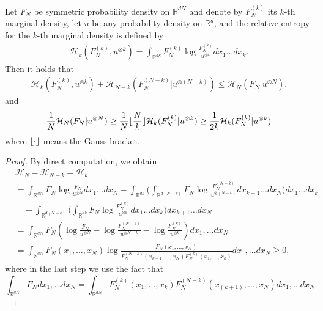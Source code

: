 \begin{lemma} \label{SAEntropy}
	Let $F_N$  be symmetric probability density on $\mathbb{R}^{dN} $ and denote 
	by $F_N^{(k)} $ its $k$-th marginal density, let $u$ be any probability density on $\mathbb{R}^{d} $,  and the relative entropy for the $k$-th marginal density is defined by
	\begin{align*}
	\mathcal{H}_{k}(F_N^{(k)},u^{\otimes k}  ) = \int_{\mathbb{R}^{dk} } F_N^{(k)}  \log \frac{F_N^{(k)} }{u^{\otimes k} } dx_{1}\ldots dx_k
	.\end{align*}
	Then it holds that
	\begin{align*}
	\mathcal{H}_{k}(F_N^{(k)},u^{\otimes k}  )  + \mathcal{H}_{N-k}(F_N^{(N-k)} | u^{\otimes (N-k)}  ) \le \mathcal{H}_{N}(F_N | u^{\otimes N} )
	.\end{align*}
	and 
	\begin{align*}
	\frac{1}{N} \mathcal{H}_N(F_N | u^{\otimes N} )  \ge \frac{1}{N} \lfloor\frac{N}{k}\rfloor \mathcal{H}_k(F_N^{(k)}|u^{\otimes k}  ) \ge  \frac{1}{2k} \mathcal{H}_k(F_N^{(k)} | u^{\otimes k}  )
	\end{align*}
	where $\lfloor\cdot\rfloor$ means the Gauss bracket.
\end{lemma}
\begin{proof}
By direct computation, we obtain
	\begin{align*}
	&\mathcal{H}_N - \mathcal{H}_{N-k}  - \mathcal{H}_{k}\\
	&= \int_{\mathbb{R}^{dN} }F_N \log  \frac{F_N}{u^{\otimes N} } dx_{1}\ldots dx_N - \int_{\mathbb{R}^{dk} }\Big(\int_{\mathbb{R}^{d(N-k)} } F_N \log \frac{F_N^{(N-k)}}{u^{\otimes (N-k)} } dx_{k+1}\ldots dx_N\Big)dx_{1}\ldots dx_k\\
	& \quad - \int_{\mathbb{R}^{d(N-k)}}\Big( \int_{\mathbb{R}^{dk} } F_N  \log  \frac{F_N^{(k)} }{u^{\otimes k} } dx_{1}\ldots dx_k\Big) dx_{k+1}\ldots dx_N \\
	&= \int_{\mathbb{R}^{dN} }F_N (\log  \frac{F_N}{u^{\otimes N} } - \log  \frac{F_N^{(N-k)} }{u^{\otimes N-k} } - \log \frac{F_N^{(k)} }{u^{\otimes k} }) dx_{1},\ldots dx_N\\
	&= \int _{\mathbb{R}^{dN} } F_N(x_1,\ldots,x_N) \log \frac{F_N(x_{1},\ldots ,x_N)}{F_N^{(N-k)}(x_{k+1},\ldots ,x_N)F_N^{(k)}(x_{1},\ldots ,x_k)}  dx_{1},\ldots dx_N \ge 0,
	\end{align*}
	where in the last step we use the fact that 
	$$
	\int_{\mathbb{R}^{dN} }F_Ndx_{1},\ldots dx_N=\int_{\mathbb{R}^{dN} }F_N^{(k)}(x_1,\ldots,x_k) F_N^{(N-k)}(x_{(k+1)},\ldots,x_N)dx_{1},\ldots dx_N.
	$$
\end{proof}


